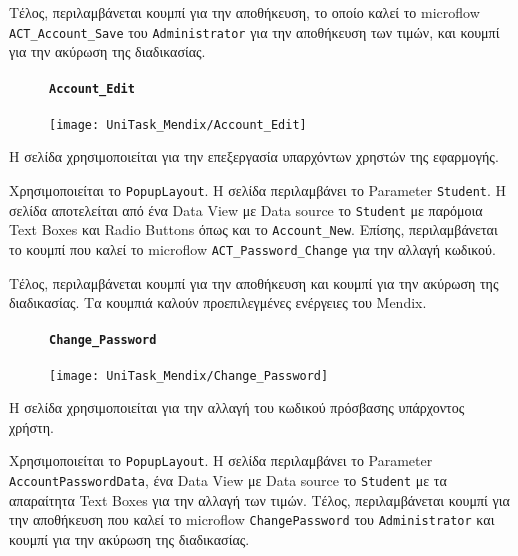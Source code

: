                    Τέλος, περιλαμβάνεται κουμπί για την αποθήκευση, το οποίο καλεί το microflow \texttt{ACT\_Account\_Save} του \texttt{Administrator} για την αποθήκευση των τιμών, και κουμπί για την ακύρωση της διαδικασίας.

                \begin{figure}[H] \noindent
                    \paragraph{\texttt{Account\_Edit}}
                    \begin{center}
                        \texttt{[image: UniTask\_Mendix/Account\_Edit]}
                    \end{center}
                \end{figure}

                    Η σελίδα χρησιμοποιείται για την επεξεργασία υπαρχόντων χρηστών της εφαρμογής.

                    Χρησιμοποιείται το \texttt{PopupLayout}. Η σελίδα περιλαμβάνει το Parameter \texttt{Student}. Η σελίδα αποτελείται από ένα Data View με Data source το \texttt{Student} με παρόμοια Text Boxes και Radio Buttons όπως και το \texttt{Account\_New}. Επίσης, περιλαμβάνεται το κουμπί που καλεί το microflow \texttt{ACT\_Password\_Change} για την αλλαγή κωδικού.

                    Τέλος, περιλαμβάνεται κουμπί για την αποθήκευση και κουμπί για την ακύρωση της διαδικασίας. Τα κουμπιά καλούν προεπιλεγμένες ενέργειες του Mendix.

                \newpage

                \begin{figure}[H] \noindent
                    \paragraph{\texttt{Change\_Password}}
                    \begin{center}
                        \texttt{[image: UniTask\_Mendix/Change\_Password]}
                    \end{center}
                \end{figure}

                    Η σελίδα χρησιμοποιείται για την αλλαγή του κωδικού πρόσβασης υπάρχοντος χρήστη.

                    Χρησιμοποιείται το \texttt{PopupLayout}. Η σελίδα περιλαμβάνει το Parameter \linebreak \texttt{AccountPasswordData}, ένα Data View με Data source το \texttt{Student} με τα απαραίτητα Text Boxes για την αλλαγή των τιμών. Τέλος, περιλαμβάνεται κουμπί για την αποθήκευση που καλεί το microflow \texttt{ChangePassword} του \texttt{Administrator} και κουμπί για την ακύρωση της διαδικασίας.

